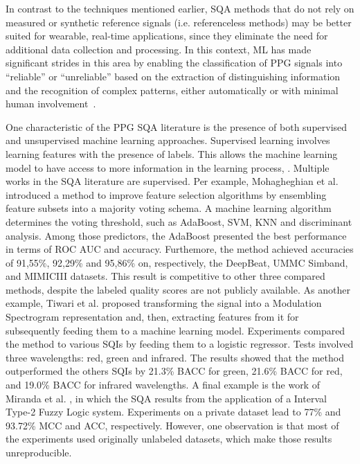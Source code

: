 In contrast to the techniques mentioned earlier, \gls{SQA} methods that do not rely on measured or synthetic reference signals (i.e. referenceless methods) may be better suited for wearable, real-time applications, since they eliminate the need for additional data collection and processing. In this context, \gls{ML} has made significant strides in this area by enabling the classification of \gls{PPG} signals into ``reliable'' or ``unreliable'' based on the extraction of distinguishing information and the recognition of complex patterns, either automatically or with minimal human involvement~\cite{janiesch2021machine}. 


		
One characteristic of the \gls{PPG} \gls{SQA} literature is the presence of both supervised and unsupervised machine learning approaches. Supervised learning involves learning features with the presence of labels. This allows the machine learning model to have access to more information in the learning process, . Multiple works in the \gls{SQA} literature are supervised. Per example, Mohagheghian et al. \cite{ppg-sqa-1} introduced a method to improve feature selection algorithms by ensembling feature subsets into a majority voting schema. A machine learning algorithm determines the voting threshold, such as AdaBoost, \gls{SVM}, \gls{KNN} and discriminant analysis. Among those predictors, the AdaBoost presented the best performance in terms of \gls{ROC AUC} and accuracy. Furthemore, the method achieved accuracies of 91,55\%, 92,29\% and 95,86\% on, respectively, the DeepBeat, UMMC Simband, and MIMICIII datasets. This result is competitive to other three compared methods, despite the labeled quality scores are not publicly available. As another example, Tiwari et al. \cite{ppg-sqa-2} proposed transforming the signal into a Modulation Spectrogram representation and, then, extracting features from it for subsequently feeding them to a machine learning model. Experiments compared the method to various \glspl{SQI} by feeding them to a logistic regressor. Tests involved three wavelengths: red, green and infrared. The results showed that the method outperformed the others \glspl{SQI} by 21.3\% \gls{BACC} for green, 21.6\% \gls{BACC} for red, and 19.0\% \gls{BACC} for infrared wavelengths. A final example is the work of Miranda et al. \cite{ppg-sqa-3}, in which the \gls{SQA} results from the application of a Interval Type-2 Fuzzy Logic system. Experiments on a private dataset lead to 77\% and 93.72\% \gls{MCC} and \gls{ACC}, respectively. However, one observation is that most of the experiments used originally unlabeled datasets, which make those results unreproducible. 
	
